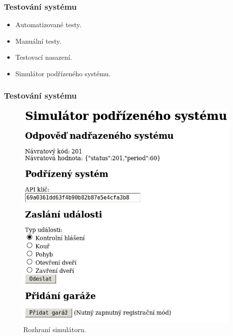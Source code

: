 \documentclass{beamer}
\begin{document}
  \begin{frame}
    \frametitle{Testování systému}

    \begin{itemize}
      \item Automatizované testy. %
      \item Manuální testy. %
      \item Testovací nasazení.
      \item Simulátor podřízeného systému.
    \end{itemize}

  \end{frame}

  \begin{frame}
    \frametitle{Testování systému}

    \begin{figure}
        \includegraphics[scale=0.25]{../images/simp.png}
        \caption{Rozhraní simulátoru.}
      \end{figure}


  \end{frame}
\end{document}
